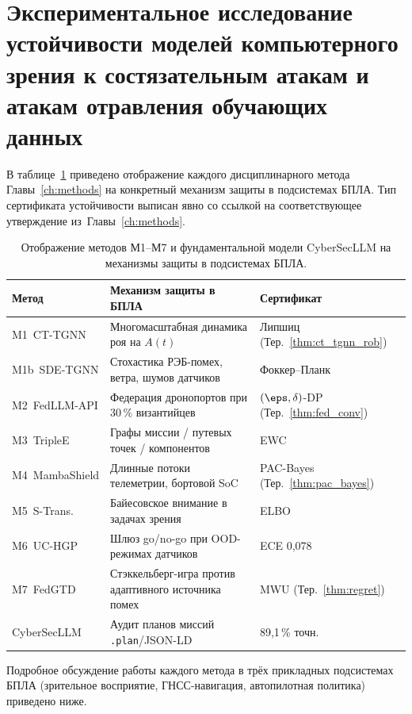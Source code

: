 \section{Экспериментальное исследование устойчивости моделей компьютерного зрения к состязательным атакам и атакам отравления обучающих данных}
\label{sec:uav_mapping}
В таблице~\ref{tab:uav_mapping} приведено отображение каждого
дисциплинарного метода Главы~\ref{ch:methods} на конкретный механизм
защиты в подсистемах БПЛА. Тип сертификата устойчивости выписан явно
со ссылкой на соответствующее утверждение из~Главы~\ref{ch:methods}.
\begin{table}[H]
\centering
\caption{Отображение методов \textsf{М1}--\textsf{М7} и фундаментальной
модели \textsf{CyberSecLLM} на механизмы защиты в подсистемах БПЛА.}
\label{tab:uav_mapping}
\small
\setlength{\tabcolsep}{4pt}
\renewcommand{\arraystretch}{1.2}
\begin{tabularx}{\linewidth}{@{}lXl@{}}
\toprule
\textbf{Метод} & \textbf{Механизм защиты в БПЛА} & \textbf{Сертификат}\\
\midrule
\textsf{M1~CT-TGNN}    & Многомасштабная динамика роя на $A(t)$               & Липшиц (Тер.~\ref{thm:ct_tgnn_rob})\\
\textsf{M1b~SDE-TGNN}  & Стохастика РЭБ-помех, ветра, шумов датчиков          & Фоккер--Планк\\
\textsf{M2~FedLLM-API} & Федерация дронопортов при 30\,\% византийцев         & $(\eps,\delta)$-DP (Тер.~\ref{thm:fed_conv})\\
\textsf{M3~TripleE}    & Графы миссии / путевых точек / компонентов           & EWC\\
\textsf{M4~MambaShield}& Длинные потоки телеметрии, бортовой SoC              & PAC-Bayes (Тер.~\ref{thm:pac_bayes})\\
\textsf{M5~S-Trans.}   & Байесовское внимание в задачах зрения                & ELBO\\
\textsf{M6~UC-HGP}     & Шлюз go/no-go при OOD-режимах датчиков               & ECE 0,078\\
\textsf{M7~FedGTD}     & Стэккельберг-игра против адаптивного источника помех & MWU (Тер.~\ref{thm:regret})\\
\textsf{CyberSecLLM}   & Аудит планов миссий \texttt{.plan}/JSON-LD           & 89,1\,\% точн.\\
\bottomrule
\end{tabularx}
\end{table}
Подробное обсуждение работы каждого метода в трёх прикладных
подсистемах БПЛА (зрительное восприятие, ГНСС-навигация, автопилотная
политика) приведено ниже.
